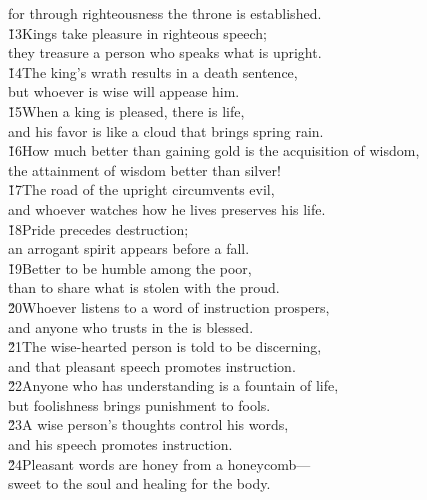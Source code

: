 \begin{poetry}
\poemll    for through righteousness the throne is established. \\
\poeml \v{13}Kings take pleasure in righteous speech; \\
\poemll    they treasure a person who speaks what is upright. \\
\poeml \v{14}The king's wrath results in a death sentence, \\
\poemll    but whoever is wise will appease him. \\
\poeml \v{15}When a king is pleased, there is life, \\
\poemll    and his favor is like a cloud that brings spring rain. \\
\poeml \v{16}How much better than gaining gold is the acquisition of wisdom, \\
\poemll    the attainment of wisdom better than silver! \\
\poeml \v{17}The road of the upright circumvents evil, \\
\poemll    and whoever watches how he lives preserves his life. \\
\poeml \v{18}Pride precedes destruction; \\
\poemll    an arrogant spirit appears before a fall. \\
\poeml \v{19}Better to be humble among the poor, \\
\poemll    than to share what is stolen with the proud. \\
\poeml \v{20}Whoever listens to a word of instruction prospers, \\
\poemll    and anyone who trusts in the  is blessed. \\
\poeml \v{21}The wise-hearted person is told to be discerning, \\
\poemll    and that pleasant speech promotes instruction. \\
\poeml \v{22}Anyone who has understanding is a fountain of life, \\
\poemll    but foolishness brings punishment to fools. \\
\poeml \v{23}A wise person's thoughts control his words, \\
\poemll    and his speech promotes instruction. \\
\poeml \v{24}Pleasant words are honey from a honeycomb--- \\
\poemll    sweet to the soul and healing for the body.

\end{poetry}
